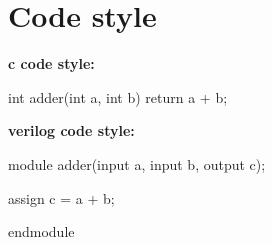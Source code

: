 \section{Code style}
\textbf{c code style:}
\begin{ccode}
int adder(int a, int b)
{
    return a + b;
}
\end{ccode}

\textbf{verilog code style:}
\begin{vcode}
module adder(input a, 
        input b,
        output c);

assign c = a + b;

endmodule
\end{vcode}

